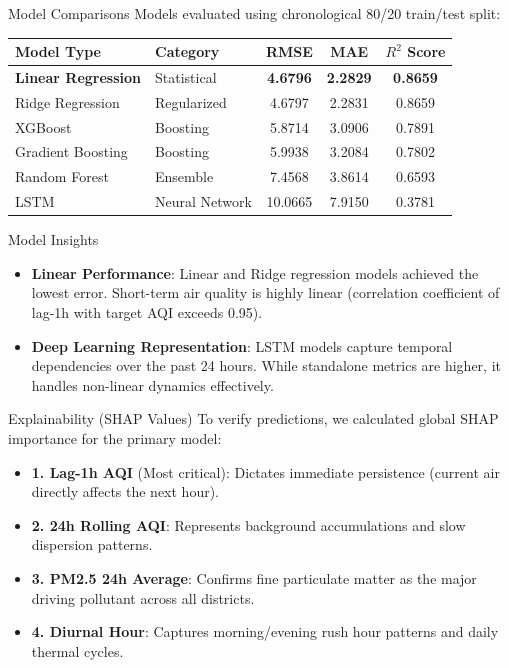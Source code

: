 \documentclass[aspectratio=169]{beamer}
\begin{document}
\begin{frame}{Model Comparisons}
  Models evaluated using chronological 80/20 train/test split:
  \begin{center}
    \begin{tabular}{llccc}
      \toprule
      Model Type & Category & RMSE & MAE & $R^2$ Score \\
      \midrule
      \textbf{Linear Regression} & Statistical & \textbf{4.6796} & \textbf{2.2829} & \textbf{0.8659} \\
      Ridge Regression & Regularized & 4.6797 & 2.2831 & 0.8659 \\
      XGBoost & Boosting & 5.8714 & 3.0906 & 0.7891 \\
      Gradient Boosting & Boosting & 5.9938 & 3.2084 & 0.7802 \\
      Random Forest & Ensemble & 7.4568 & 3.8614 & 0.6593 \\
      LSTM & Neural Network & 10.0665 & 7.9150 & 0.3781 \\
      \bottomrule
    \end{tabular}
  \end{center}
\end{frame}

\begin{frame}{Model Insights}
  \begin{itemize}
    \item \textbf{Linear Performance}: Linear and Ridge regression models achieved the lowest error. Short-term air quality is highly linear (correlation coefficient of lag-1h with target AQI exceeds 0.95).
    \item \textbf{Deep Learning Representation}: LSTM models capture temporal dependencies over the past 24 hours. While standalone metrics are higher, it handles non-linear dynamics effectively.
  \end{itemize}
\end{frame}

\begin{frame}{Explainability (SHAP Values)}
  To verify predictions, we calculated global SHAP importance for the primary model:
  \begin{itemize}
    \item \textbf{1. Lag-1h AQI} (Most critical): Dictates immediate persistence (current air directly affects the next hour).
    \item \textbf{2. 24h Rolling AQI}: Represents background accumulations and slow dispersion patterns.
    \item \textbf{3. PM2.5 24h Average}: Confirms fine particulate matter as the major driving pollutant across all districts.
    \item \textbf{4. Diurnal Hour}: Captures morning/evening rush hour patterns and daily thermal cycles.
  \end{itemize}
\end{frame}
\end{document}

